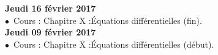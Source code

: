 \documentclass[12pt,a4paper]{article}
\begin{document}
%  
% 
%  
% 
%  
%  
%  
%  
%  

\noindent\textbf{\bf Jeudi 16 février 2017 \rm}\\
$\bullet$\ Cours : Chapitre X :\rm Équations différentielles (fin).
\vspace{.4cm}\\

\noindent\textbf{\bf Jeudi 09 février 2017 \rm}\\
$\bullet$\ Cours : Chapitre X :\rm Équations différentielles (début).
\vspace{.4cm}\\
\end{document}
